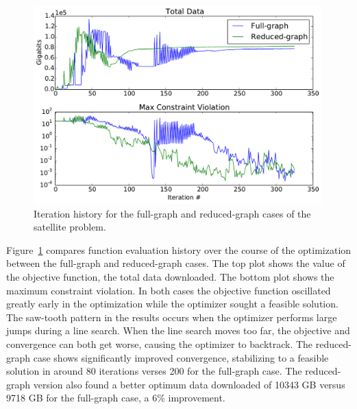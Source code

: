 \documentclass[]{aiaa-tc} %
\begin{document}
            \begin{figure}[!htb]
            \centering
            \includegraphics[width=0.99\textwidth]{images/cadre_opt_progress}
            \caption[width=0.22\textwidth]{Iteration history for the full-graph and reduced-graph cases of the satellite problem. 
            \label{convergence}
            }
            \end{figure}


            Figure~\ref{convergence} compares function evaluation history over the course of
            the optimization between the full-graph and reduced-graph cases. The top plot shows the value of the objective function, the total data downloaded.
            The bottom plot shows the maximum constraint violation. In both cases the objective function oscillated greatly early in the optimization while 
            the optimizer sought a feasible solution. The saw-tooth pattern in the results occurs when the optimizer performs large
            jumps during a line search. When the line search moves too far, the objective and convergence can both get worse, causing the
            optimizer to backtrack. The reduced-graph case shows significantly improved convergence, stabilizing to a feasible solution 
            in around 80 iterations verses 200 for the full-graph case. The reduced-graph version also found a better optimum data downloaded 
            of 10343 GB versus 9718 GB for the full-graph case, a 6\% improvement. 
\end{document}
